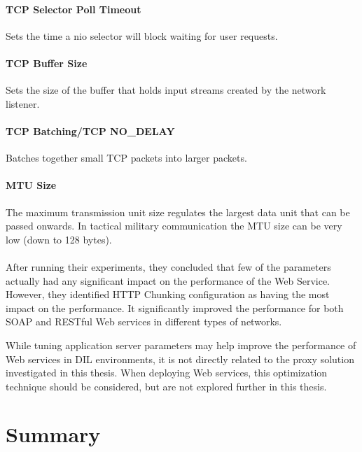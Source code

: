 \paragraph{TCP Selector Poll Timeout} Sets the time a \gls{nio} selector will
block waiting for user requests.

\paragraph{TCP Buffer Size} Sets the size of the buffer that holds input streams
created by the network listener.

\paragraph{TCP Batching/TCP NO\_DELAY} Batches together small TCP packets into
larger packets.

\paragraph{MTU Size} The maximum transmission unit size regulates the largest
data unit that can be passed onwards. In tactical military communication the MTU
size can be very low (down to 128 bytes).

\paragraph{}

After running their experiments, they concluded that few of the parameters
actually had any significant impact on the performance of the Web Service.
However, they identified HTTP Chunking configuration as having the most impact
on the performance. It significantly improved the performance for both SOAP and
RESTful Web services in different types of networks.

While tuning application server parameters may help improve the performance of
Web services in DIL environments, it is not directly related to the proxy
solution investigated in this thesis. When deploying Web services, this
optimization technique should be considered, but are not explored further in
this thesis.


\section{Summary}

